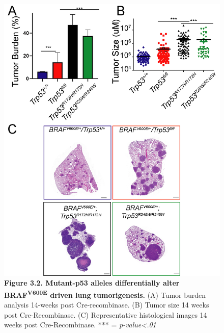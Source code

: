 \begin{figure}
\hypertarget{fig:3.2}{%
\centering
\includegraphics[width=1\textwidth,height=\textheight]{images/p53_2.png}
\caption{\textbf{Figure 3.2. Mutant-p53 alleles differentially alter BRAF\textsuperscript{V600E} driven lung tumorigenesis.} (A) Tumor burden analysis 14-weeks post Cre-recombinase. (B) Tumor size 14 weeks post Cre-Recombinase. (C) Representative histological images 14 weeks post Cre-Recombinase. *** = \emph{p-value\textless.01}}\label{fig:3.2}
}
\end{figure}

